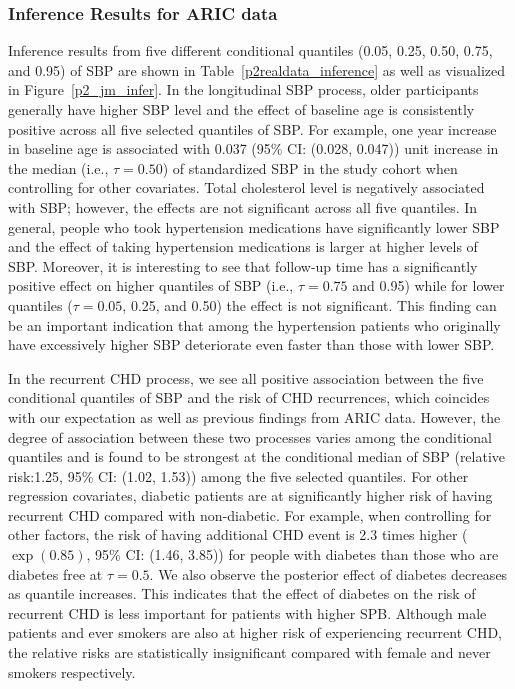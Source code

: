 \subsubsection{Inference Results for ARIC data}\label{sec:p2data_results}
Inference results from five different conditional quantiles (0.05, 0.25, 0.50, 0.75, and 0.95) of SBP are shown in Table~\ref{p2realdata_inference} as well as visualized in Figure~\ref{p2_jm_infer}. In the longitudinal SBP process, older participants generally have higher SBP level and the effect of baseline age is consistently positive across all five selected quantiles of SBP. For example, one year increase in baseline age is associated with 0.037 (95\% CI: (0.028, 0.047)) unit increase in the median (i.e., $\tau=0.50$) of standardized SBP in the study cohort when controlling for other covariates. Total cholesterol level is negatively associated with SBP; however, the effects are not significant across all five quantiles. In general, people who took hypertension medications have significantly lower SBP and the effect of taking hypertension medications is larger at higher levels of SBP. Moreover, it is interesting to see that follow-up time has a significantly positive effect on higher quantiles of SBP (i.e., $\tau=0.75$ and 0.95) while for lower quantiles ($\tau=0.05$, 0.25, and 0.50) the effect is not significant. This finding can be an important indication that among the hypertension patients who originally have excessively higher SBP deteriorate even faster than those with lower SBP.

In the recurrent CHD process, we see all positive association between the five conditional quantiles of SBP and the risk of CHD recurrences, which coincides with our expectation as well as previous findings from ARIC data. However, the degree of association between these two processes varies among the conditional quantiles and is found to be strongest at the conditional median of SBP (relative risk:1.25, 95\% CI: (1.02, 1.53)) among the five selected quantiles. For other regression covariates, diabetic patients are at significantly higher risk of having recurrent CHD compared with non-diabetic. For example, when controlling for other factors, the risk of having additional CHD event is 2.3 times higher ($\exp(0.85)$, 95\% CI: (1.46, 3.85)) for people with diabetes than those who are diabetes free at $\tau=0.5$. We also observe the posterior effect of diabetes decreases as quantile increases. This indicates that the effect of diabetes on the risk of recurrent CHD is less important for patients with higher SPB. Although male patients and ever smokers are also at higher risk of experiencing recurrent CHD, the relative risks are statistically insignificant compared with female and never smokers respectively.

